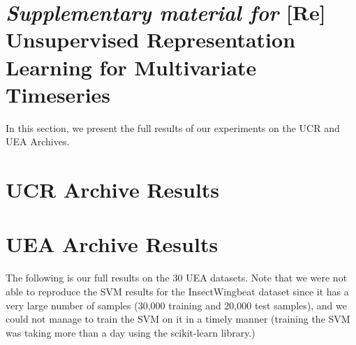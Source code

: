 

\section*{\textit{Supplementary material for} [Re] Unsupervised Representation Learning for Multivariate Timeseries}

%
In this section, we present the full results of our experiments on the UCR and UEA Archives.

\section{UCR Archive Results}
\drawucrsteps
 

\section{UEA Archive Results}
The following is our full results on the 30 UEA datasets. Note that we were not able to reproduce the SVM results for the InsectWingbeat dataset since it has a very large number of samples (30,000 training and 20,000 test samples), and we could not manage to train the SVM on it in a timely manner (training the SVM was taking more than a day using the scikit-learn library.)

\drawueasteps

%

 



